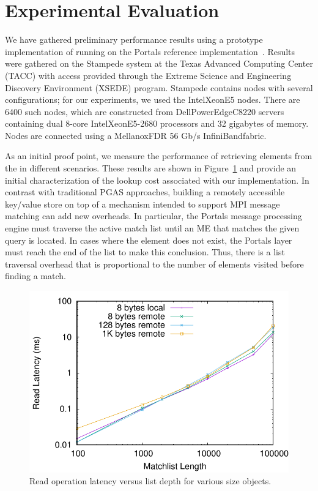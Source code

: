 \section{Experimental Evaluation}
\label{sec:results}

We have gathered preliminary performance results using a prototype
implementation of \pdht running on the Portals reference
implementation~\cite{portals-code}.  Results were gathered on the Stampede
system at the Texas Advanced Computing Center (TACC) with access provided
through the Extreme Science and Engineering Discovery Environment (XSEDE)
program.  Stampede contains nodes with several configurations; for our
experiments, we used the Intel\regtm Xeon\regtm E5 nodes.  There are 6400 such
nodes, which are constructed from Dell\othertm PowerEdge\othertm C8220 servers
containing dual 8-core Intel\regtm Xeon\regtm E5-2680 processors and 32
gigabytes of memory.  Nodes are connected using a Mellanox\othertm FDR 56 Gb/s
InfiniBand\othertm fabric.

As an initial proof point, we measure the performance of retrieving elements
from the \pdht in different scenarios.  These results are shown in
Figure~\ref{fig:mlen} and provide an initial characterization of the lookup
cost associated with our \pdht implementation.  In contrast with traditional
PGAS approaches, building a remotely accessible key/value store on top of a
mechanism intended to support MPI message matching can add new overheads.  In
particular, the Portals message processing engine must traverse the active
match list until an ME that matches the given query is located.  In cases where
the element does not exist, the Portals layer must reach the end of the list to
make this conclusion.  Thus, there is a list traversal overhead that is
proportional to the number of elements visited before finding a match.

\begin{figure}
    \centering
    \includegraphics[width=\linewidth]{plots/mlen}
    \caption{Read operation latency versus list depth for various size objects.}
    \label{fig:mlen}
\end{figure}

